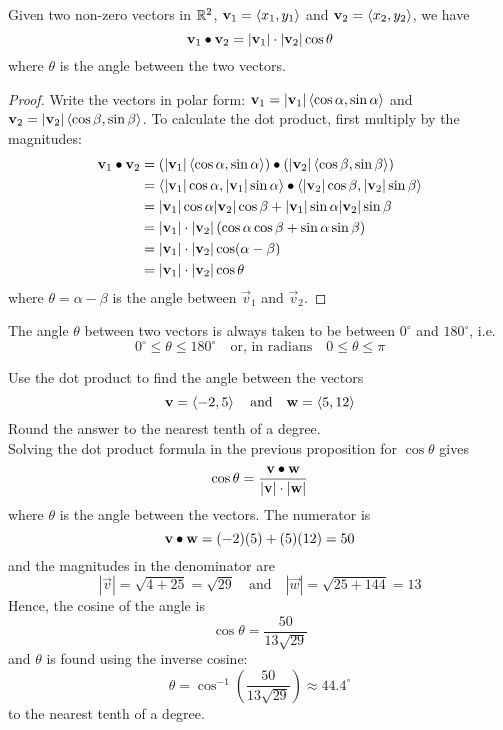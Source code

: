 \documentclass[handout]{ximera}
\begin{document}
\begin{proposition}
Given two non-zero vectors in $\mathbb R^2$, $\mathbf{v}_1 = \left\langle x_1, y_1\right\rangle$ and $\mathbf{v}_2 = \left\langle x_2, y_2\right\rangle$, we have
\[
\mathbf{v}_1 \bullet \mathbf{v}_2 = |\mathbf{v}_1| \cdot |\mathbf{v}_2| \cos \theta
\]
where $\theta$ is the angle between the two vectors.
\begin{proof}
Write the vectors in polar form: $\mathbf{v}_1 = |\mathbf{v}_1| \left\langle \cos \alpha, \sin \alpha\right\rangle$ and 
$\mathbf{v}_2 = |\mathbf{v}_2| \left\langle \cos \beta, \sin \beta\right\rangle$. To calculate the dot product, first multiply by the magnitudes:
\begin{align*}
\mathbf{v}_1 \bullet \mathbf{v}_2 & = \left(|\mathbf{v}_1| \left\langle \cos \alpha, \sin \alpha\right\rangle\right) \bullet \left( |\mathbf{v}_2| \left\langle \cos \beta, \sin \beta\right\rangle \right)\\
                            &= \left\langle |\mathbf{v}_1|\cos \alpha, |\mathbf{v}_1|\sin \alpha\right\rangle \bullet   \left\langle |\mathbf{v}_2|\cos \beta, |\mathbf{v}_2|\sin \beta\right\rangle \\
                            &= |\mathbf{v}_1| \cos \alpha |\mathbf{v}_2|\cos \beta + |\mathbf{v}_1|\sin \alpha |\mathbf{v}_2|\sin \beta\\
                            &= |\mathbf{v}_1|\cdot |\mathbf{v}_2| \left(\cos \alpha \cos \beta + \sin \alpha \sin \beta\right)\\
                            &= |\mathbf{v}_1| \cdot|\mathbf{v}_2| \cos(\alpha - \beta)\\
                            &= |\mathbf{v}_1| \cdot |\mathbf{v}_2| \cos \theta
\end{align*}
where $\theta = \alpha - \beta$ is the angle between $\vec{v}_1$ and $\vec{v}_2$.
\end{proof}
\end{proposition}
\begin{remark} The angle $\theta$ between two vectors is always taken to be between $0^\circ$ and $180^\circ$, i.e.
\[
0^\circ \leq \theta \leq 180^\circ \quad \text{or, in radians} \quad 0 \leq \theta \leq \pi
\]
\end{remark}

\begin{example}[Example 2] Use the dot product to find the angle between the vectors 
\[
\mathbf v = \left\langle -2,5\right\rangle \quad \text{and} \quad \mathbf w = \left\langle 5,12\right\rangle
\]
Round the answer to the nearest tenth of a degree.\\
Solving the dot product formula in the previous proposition for $\cos \theta$ gives
\[
\cos \theta = \frac{\mathbf v \bullet \mathbf w}{|\mathbf v| \cdot |\mathbf w|}
\]
where $\theta$ is the angle between the vectors. The numerator is
\[
\mathbf v \bullet \mathbf w = (-2)(5) + (5)(12) = 50
\]
and the magnitudes in the denominator are 
\[
|\vec v| = \sqrt{ 4 + 25} = \sqrt{29} \quad \text{and} \quad |\vec w| = \sqrt{25 +144 } = 13
\]
Hence, the cosine of the angle is
\[
\cos \theta = \frac{50}{13\sqrt{29}}
\]
and $\theta$ is found using the inverse cosine:
\[
\theta = \cos^{-1}\left(\frac{50}{13\sqrt{29}} \right) \approx 44.4^\circ
\]
to the nearest tenth of a degree.
\end{example}
\end{document}
